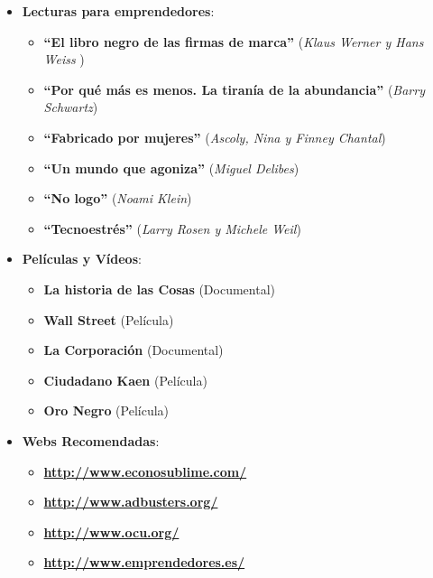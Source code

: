 \begin{itemize}
    \item \textbf{Lecturas para emprendedores}:
    \begin{itemize}
        \item \textbf{``El libro negro de las firmas de marca''} (\textit{Klaus Werner y Hans Weiss	})
        \item \textbf{``Por qué más es menos. La tiranía de la abundancia''} (\textit{Barry Schwartz})
        \item \textbf{``Fabricado por mujeres''} (\textit{Ascoly, Nina y Finney Chantal})
        \item \textbf{``Un mundo que agoniza''} (\textit{Miguel Delibes})
        \item \textbf{``No logo''} (\textit{Noami Klein})
        \item \textbf{``Tecnoestrés''} (\textit{Larry Rosen y Michele Weil})
    \end{itemize}

    \item \textbf{Películas y Vídeos}:
    \begin{itemize}
        \item \textbf{La historia de las Cosas} (Documental)
        \item \textbf{Wall Street} (Película)
        \item \textbf{La Corporación} (Documental)
        \item \textbf{Ciudadano Kaen} (Película)
        \item \textbf{Oro Negro} (Película)
    \end{itemize}

    \item \textbf{Webs Recomendadas}:
    \begin{itemize}
        \item \textbf{\url{http://www.econosublime.com/}}
        \item \textbf{\url{http://www.adbusters.org/}}
        \item \textbf{\url{http://www.ocu.org/}}
        \item \textbf{\url{http://www.emprendedores.es/}}
    \end{itemize}
\end{itemize}


\appendix








